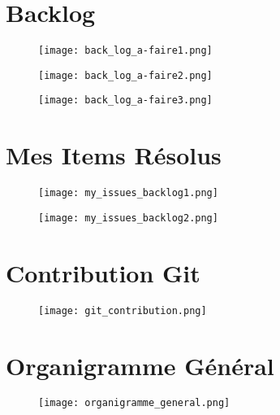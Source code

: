 \begin{appendices}
\section{Backlog}\label{appen:backlog}

\begin{figure}[!ht]
\centering
\texttt{[image: back\_log\_a-faire1.png]}
\end{figure}

\begin{figure}[!ht]
\centering
\texttt{[image: back\_log\_a-faire2.png]}
\end{figure}

\begin{figure}[!ht]
\centering
\texttt{[image: back\_log\_a-faire3.png]}
\end{figure}


\newpage
\section{Mes Items Résolus}\label{appen:my_backlog}
\begin{figure}[!ht]
\centering
\texttt{[image: my\_issues\_backlog1.png]}
\end{figure}

\begin{figure}[!ht]
\centering
\texttt{[image: my\_issues\_backlog2.png]}
\end{figure}

\newpage
\section{Contribution Git}\label{appen:git_contribution}
\begin{figure}[!ht]
\centering
\texttt{[image: git\_contribution.png]}
\end{figure}

\newpage
\section{Organigramme Général}\label{appen:organigramme_general}
\begin{figure}[!ht]
\centering
\texttt{[image: organigramme\_general.png]}
\end{figure}

\end{appendices}
